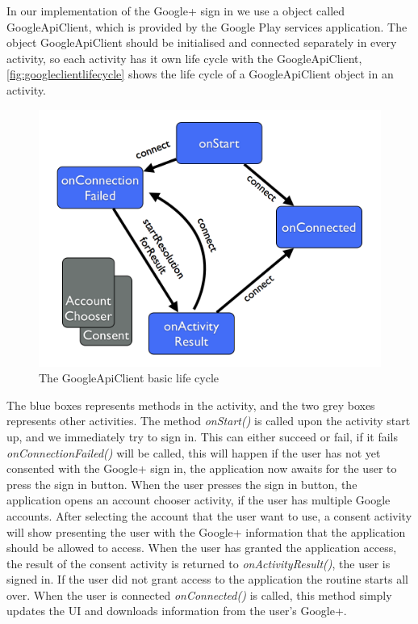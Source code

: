 In our implementation of the Google+ sign in we use a object called \\GoogleApiClient\citep{googleapiclient-docs}, which is provided by the Google Play services application. 
The object GoogleApiClient should be initialised and connected separately in every activity, so each activity has it own life cycle with the GoogleApiClient, \autoref{fig:googleclientlifecycle} shows the life cycle of a GoogleApiClient object in an activity.
\begin{figure}[H]
\centering
\includegraphics[width=0.8\linewidth]{img/googleclientflow.png}
\caption{The GoogleApiClient basic life cycle\cite{googleapiclient-lifecycle}}
\label{fig:googleclientlifecycle}
\end{figure}
The blue boxes represents methods in the activity, and the two grey boxes represents other activities. The method \textit{onStart()} is called upon the activity start up, and we immediately try to sign in. 
This can either succeed or fail, if it fails \textit{onConnectionFailed()} will be called, this will happen if the user has not yet consented with the Google+ sign in, the application now awaits for the user to press the sign in button. 
When the user presses the sign in button, the application opens an account chooser activity, if the user has multiple Google accounts. 
After selecting the account that the user want to use, a consent activity will show presenting the user with the Google+ information that the application should be allowed to access. 
When the user has granted the application access, the result of the consent activity is returned to \textit{onActivityResult()}, the user is signed in. 
If the user did not grant access to the application the routine starts all over. When the user is connected \textit{onConnected()} is called, this method simply updates the UI and downloads information from the user's Google+. 

